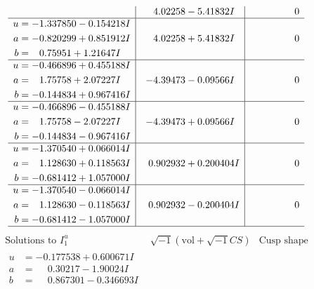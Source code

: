 \documentclass[1p]{elsarticle_modified}
\theoremstyle{definition}
\newcommand{\I}{\sqrt{-1}}
\begin{document}
$$\begin{array}{c|c|c}
 & \phantom{-}4.02258 - 5.41832 I & \phantom{-0.000000 } 0 \\ \hline\begin{aligned}
u &= -1.337850 - 0.154218 I \\
a &= -0.820299 + 0.851912 I \\
b &= \phantom{-}0.75951 + 1.21647 I\end{aligned}
 & \phantom{-}4.02258 + 5.41832 I & \phantom{-0.000000 } 0 \\ \hline\begin{aligned}
u &= -0.466896 + 0.455188 I \\
a &= \phantom{-}1.75758 + 2.07227 I \\
b &= -0.144834 + 0.967416 I\end{aligned}
 & -4.39473 - 0.09566 I & \phantom{-0.000000 } 0 \\ \hline\begin{aligned}
u &= -0.466896 - 0.455188 I \\
a &= \phantom{-}1.75758 - 2.07227 I \\
b &= -0.144834 - 0.967416 I\end{aligned}
 & -4.39473 + 0.09566 I & \phantom{-0.000000 } 0 \\ \hline\begin{aligned}
u &= -1.370540 + 0.066014 I \\
a &= \phantom{-}1.128630 + 0.118563 I \\
b &= -0.681412 + 1.057000 I\end{aligned}
 & \phantom{-}0.902932 + 0.200404 I & \phantom{-0.000000 } 0 \\ \hline\begin{aligned}
u &= -1.370540 - 0.066014 I \\
a &= \phantom{-}1.128630 - 0.118563 I \\
b &= -0.681412 - 1.057000 I\end{aligned}
 & \phantom{-}0.902932 - 0.200404 I & \phantom{-0.000000 } 0\\
 \hline 
 \end{array}$$\newpage$$\begin{array}{c|c|c}  
\text{Solutions to }I^u_{1}& \I (\text{vol} + \sqrt{-1}CS) & \text{Cusp shape}\\
 \hline 
\begin{aligned}
u &= -0.177538 + 0.600671 I \\
a &= \phantom{-}0.30217 - 1.90024 I \\
b &= \phantom{-}0.867301 - 0.346693 I\end{aligned}

\end{array}$$
\end{document}
